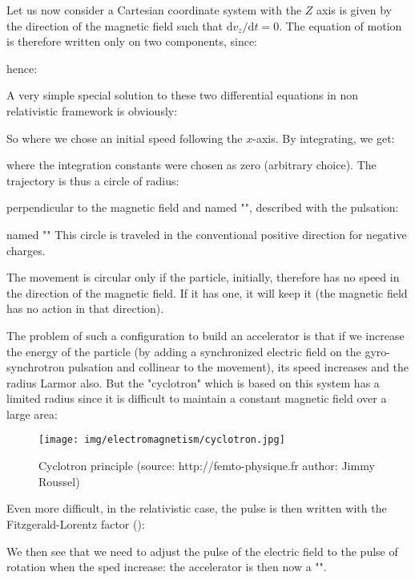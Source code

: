 	Let us now consider a Cartesian coordinate system with the $Z$ axis is given by the direction of the magnetic field such that $\mathrm{d}v_z/\mathrm{d}t=0$. The equation of motion is therefore written only on two components, since:
	
	hence:
	
	A very simple special solution to these two differential equations in non relativistic framework is obviously:
	
	So where we chose an initial speed following the $x$-axis. By integrating, we get:
	
	where the integration constants were chosen as zero (arbitrary choice). The trajectory is thus a circle of radius:
	
	perpendicular to the magnetic field and named "", described with the pulsation:
	
	named "" This circle is traveled in the conventional positive direction for negative charges.
	\begin{tcolorbox}[title=Remark,colframe=black,arc=10pt]
	The movement is circular only if the particle, initially, therefore has no speed in the direction of the magnetic field. If it has one, it will keep it (the magnetic field has no action in that direction).
	\end{tcolorbox}
	The problem of such a configuration to build an accelerator is that if we increase the energy of the particle (by adding a synchronized electric field on the gyro-synchrotron pulsation and collinear to the movement), its speed increases and the radius Larmor also. But the "cyclotron" which is based on this system has a limited radius since it is difficult to maintain a constant magnetic field over a large area:
	\begin{figure}[H]
		\centering
		\texttt{[image: img/electromagnetism/cyclotron.jpg]}
		\caption{Cyclotron principle (source:  http://femto-physique.fr author: Jimmy Roussel)}
	\end{figure}

	Even more difficult, in the relativistic case, the pulse is then written with the Fitzgerald-Lorentz factor ():
	
	We then see that we need to adjust the pulse of the electric field to the pulse of rotation when the sped increase: the accelerator is then now a "".
	
